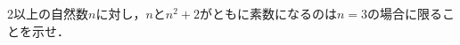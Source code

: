 \documentclass[../../main.tex]{subfiles}
\begin{document}
2以上の自然数$n$に対し，$n$と$n^2+2$がともに素数になるのは$n=3$の場合に限ることを示せ．
\end{document}

